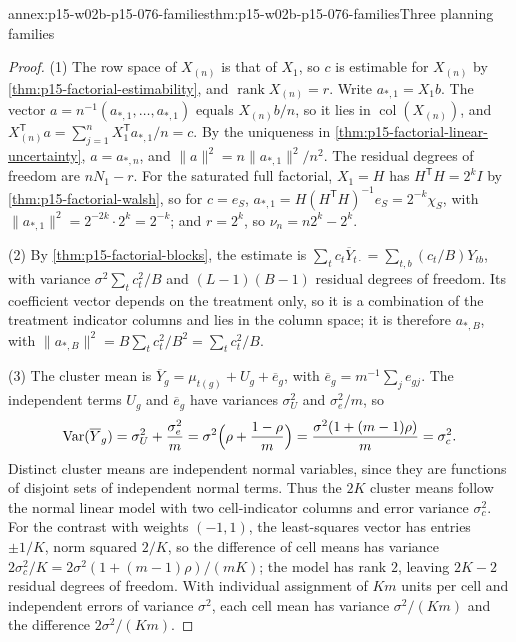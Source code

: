 \begin{annexitem}{annex:p15-w02b-p15-076-families}{thm:p15-w02b-p15-076-families}{Three planning families}
\begin{proof}
(1) The row space of \(X_{(n)}\) is that of \(X_1\), so \(c\) is estimable
for \(X_{(n)}\) by \cref{thm:p15-factorial-estimability}, and
\(\operatorname{rank}X_{(n)}=r\). Write \(a_{*,1}=X_1b\). The vector
\(a=n^{-1}(a_{*,1},\ldots,a_{*,1})\) equals \(X_{(n)}b/n\), so it lies in
\(\operatorname{col}(X_{(n)})\), and
\(X_{(n)}^{\mathsf T}a=\sum_{j=1}^nX_1^{\mathsf T}a_{*,1}/n=c\). By the
uniqueness in \cref{thm:p15-factorial-linear-uncertainty}, \(a=a_{*,n}\),
and \(\|a\|^2=n\|a_{*,1}\|^2/n^2\). The residual degrees of freedom are
\(nN_1-r\). For the saturated full factorial, \(X_1=H\) has
\(H^{\mathsf T}H=2^kI\) by \cref{thm:p15-factorial-walsh}, so for
\(c=e_S\), \(a_{*,1}=H(H^{\mathsf T}H)^{-1}e_S=2^{-k}\chi_S\), with
\(\|a_{*,1}\|^2=2^{-2k}\cdot2^k=2^{-k}\); and \(r=2^k\), so
\(\nu_n=n2^k-2^k\).

(2) By \cref{thm:p15-factorial-blocks}, the estimate is
\(\sum_tc_t\overline Y_{t\cdot}=\sum_{t,b}(c_t/B)Y_{tb}\), with variance
\(\sigma^2\sum_tc_t^2/B\) and \((L-1)(B-1)\) residual degrees of freedom.
Its coefficient vector depends on the treatment only, so it is a
combination of the treatment indicator columns and lies in the column
space; it is therefore \(a_{*,B}\), with
\(\|a_{*,B}\|^2=B\sum_tc_t^2/B^2=\sum_tc_t^2/B\).

(3) The cluster mean is
\(\overline Y_g=\mu_{t(g)}+U_g+\overline e_g\), with
\(\overline e_g=m^{-1}\sum_je_{gj}\). The independent terms \(U_g\) and
\(\overline e_g\) have variances \(\sigma_U^2\) and \(\sigma_e^2/m\), so
\[
 \operatorname{Var}(\overline Y_g)=\sigma_U^2+\frac{\sigma_e^2}{m}
 =\sigma^2\Bigl(\rho+\frac{1-\rho}m\Bigr)
 =\frac{\sigma^2(1+(m-1)\rho)}m=\sigma_c^2.
\]
Distinct cluster means are independent normal variables, since they are
functions of disjoint sets of independent normal terms. Thus the \(2K\)
cluster means follow the normal linear model with two cell-indicator
columns and error variance \(\sigma_c^2\). For the contrast with weights
\((-1,1)\), the least-squares vector has entries \(\pm1/K\), norm squared
\(2/K\), so the difference of cell means has variance
\(2\sigma_c^2/K=2\sigma^2(1+(m-1)\rho)/(mK)\); the model has rank \(2\),
leaving \(2K-2\) residual degrees of freedom. With individual assignment
of \(Km\) units per cell and independent errors of variance
\(\sigma^2\), each cell mean has variance \(\sigma^2/(Km)\) and the
difference \(2\sigma^2/(Km)\).
\end{proof}
\end{annexitem}

